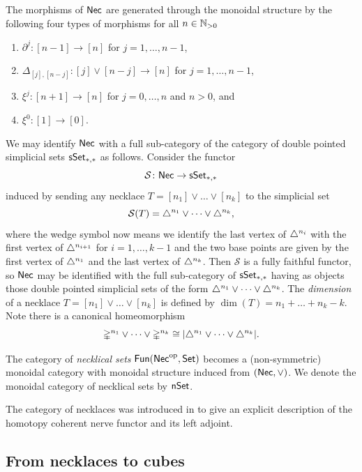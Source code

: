 The morphisms of $\mathsf{Nec}$ are generated through the monoidal structure by the following four types of morphisms for all $n \in\mathbb{N}_{>0}$
\begin{enumerate}
	\item $\partial^j \colon [n-1] \to [n]$ for $j = 1, \dots, n-1$,
	\item $\Delta_{[j], [n-j]} \colon [j] \vee [n-j] \to [n]$ for $j = 1, \dots, n-1$,
	\item $\xi^j \colon [n+1] \to [n]$ for $j = 0, \dots, n$ and $n>0$, and
	\item $\xi^0 \colon [1] \to [0]$.
\end{enumerate}
We may identify $\mathsf{Nec}$ with a full sub-category of the category of double pointed simplicial sets $\mathsf{sSet}_{*,*}$ as follows.
Consider the functor
\[
\mathcal{S} \colon \mathsf{Nec} \to \mathsf{sSet}_{*,*}
\]
induced by sending any necklace $T = [n_1] \vee \dots \vee[n_k]$ to the simplicial set
\[
\mathcal{S}(T) = \triangle^{n_1} \vee \dots \vee \triangle^{n_k},
\]
where the wedge symbol now means we identify the last vertex of $\triangle^{n_i}$ with the first vertex of $\triangle^{n_{i+1}}$ for $i = 1, \dots, k-1$ and the two base points are given by the first vertex of $\triangle^{n_1}$ and the last vertex of $\triangle^{n_k}$.
Then $\mathcal{S}$ is a fully faithful functor, so $\mathsf{Nec}$ may be identified with the full sub-category of $\mathsf{sSet}_{*,*}$ having as objects those double pointed simplicial sets of the form $\triangle^{n_1} \vee \dots \vee \triangle^{n_k}$.
The \textit{dimension} of a necklace $T = [n_1] \vee\dots\vee [n_k]$ is defined by $\dim(T) = n_1 + \dots + n_k-k$. Note there is a canonical homeomorphism \[\mathbb{\Delta}^{n_1} \vee \cdots \vee \mathbb{\Delta}^{n_k} \cong | \triangle^{n_1} \vee \cdots \vee \triangle^{n_k}|.\]


The category of \textit{necklical sets} $\mathsf{Fun}(\mathsf{Nec}^{\mathrm{op}}, \mathsf{Set})$ becomes a (non-symmetric) monoidal category with monoidal structure induced from $(\mathsf{Nec}, \vee)$.
We denote the monoidal category of necklical sets by $\mathsf{nSet}$.

\begin{remark*}
	The category of necklaces was introduced in \cite{dugger2011rigidification} to give an explicit description of the homotopy coherent nerve functor and its left adjoint.
\end{remark*}

\subsection{From necklaces to cubes}

